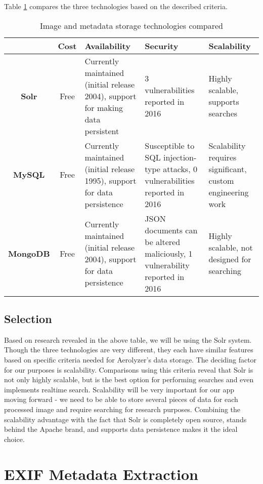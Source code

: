\documentclass[onecolumn, draftclsnofoot,10pt, compsoc]{IEEEtran}
\begin{document}
\begin{flushleft}
Table \ref{table:1} compares the three technologies based on the described criteria. \cite{8} \cite{9}
\begin{table}[h!]
\caption{Image and metadata storage technologies compared}\label{table:1}
\centering
	\begin{tabular}{| c | c |  p{4cm}  |  p{4cm}  | p{4cm} |} 
		\hline
		 & Cost & Availability & Security & Scalability \\ [0.5ex] 
		\hline
		\textbf{Solr} & Free & Currently maintained (initial release 2004), support for making data persistent & 3 vulnerabilities reported in 2016 & Highly scalable, supports searches \\ 
		\hline
		\textbf{MySQL} & Free & Currently maintained (initial release 1995), support for data persistence & Susceptible to SQL injection-type attacks, 0 vulnerabilities reported in 2016 &  Scalability requires significant, custom engineering work\\
		\hline
		\textbf{MongoDB} & Free & Currently maintained (initial release 2004), support for data persistence & JSON documents can be altered maliciously, 1 vulnerability reported in 2016 & Highly scalable, not designed for searching \\
		\hline
	\end{tabular}
\end{table}



\subsection{Selection}
Based on research revealed in the above table, we will be using the Solr system. Though the three technologies are very different, they each have similar features based on specific criteria needed for Aerolyzer's data storage. The deciding factor for our purposes is scalability. Comparisons using this criteria reveal that Solr is not only highly scalable, but is the best option for performing searches and even implements realtime search. \cite{5} Scalability will be very important for our app moving forward - we need to be able to store several pieces of data for each processed image and require searching for research purposes. Combining the scalability advantage with the fact that Solr is completely open source, stands behind the Apache brand, and supports data persistence makes it the ideal choice.


\section{EXIF Metadata Extraction}

\end{flushleft}
\end{document}
